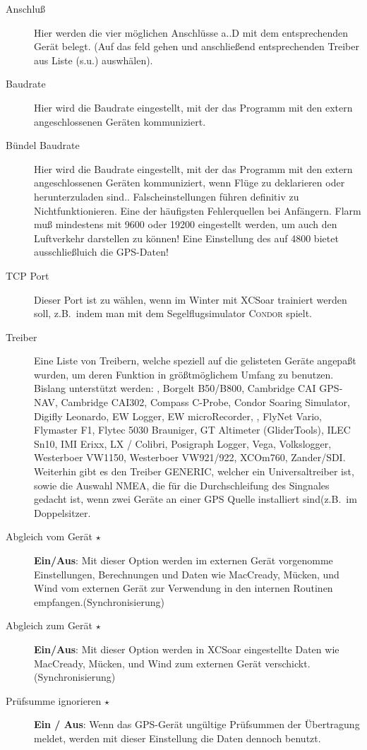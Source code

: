 \begin{description}
\item[Anschluß]  Hier werden die vier möglichen Anschlüsse a..D mit dem entsprechenden Gerät belegt. (Auf das feld gehen und anschließend entsprechenden Treiber aus Liste (s.u.) auswhälen).
\item[Baudrate] Hier wird die Baudrate eingestellt, mit der das Programm mit den extern angeschlossenen Geräten kommuniziert.
\item[Bündel Baudrate]  Hier wird die Baudrate eingestellt, mit der das Programm mit den extern angeschlossenen Geräten kommuniziert, wenn Flüge zu deklarieren oder herunterzuladen sind..
Falscheinstellungen führen definitiv zu Nichtfunktionieren. Eine der häufigsten  Fehlerquellen bei Anfängern.
\achtung Flarm muß  mindestens mit 9600 oder 19200 eingestellt werden, um auch den Luftverkehr darstellen zu können! Eine Einstellung des \fl auf 4800 bietet ausschließluich die GPS-Daten!
\item[TCP Port]  Dieser Port ist zu wählen, wenn  im Winter mit \textsf{XCSoar} trainiert werden soll, z.B.\ indem man  mit dem
Segelflugsimulator \textsc{Condor} spielt.
\item[Treiber] Eine Liste von Treibern, welche speziell auf die gelisteten Geräte angepaßt wurden, um deren Funktion in größtmöglichem Umfang zu benutzen.
Bislang unterstützt werden: \al, Borgelt B50/B800, Cambridge CAI GPS-NAV, Cambridge CAI302, Compass C-Probe, Condor Soaring Simulator, Digifly Leonardo,  EW Logger, EW microRecorder,
\fl, FlyNet Vario, Flymaster F1, Flytec 5030 Brauniger, GT Altimeter (GliderTools), ILEC Sn10, IMI Erixx, LX / Colibri, Posigraph Logger, Vega, Volkslogger, Westerboer VW1150, Westerboer VW921/922, XCOm760, Zander/SDI.
Weiterhin gibt es den Treiber GENERIC, welcher ein Universaltreiber ist, sowie die Auswahl NMEA, die für die Durchschleifung des Singnales gedacht ist, wenn zwei Geräte an einer GPS Quelle installiert sind(z.B.\ im Doppelsitzer.
\item[Abgleich vom Gerät $\star$]  {\bf Ein/Aus}: Mit dieser Option werden im externen Gerät vorgenomme Einstellungen, Berechnungen und Daten wie MacCready, Mücken, und Wind vom externen Gerät zur Verwendung in den internen Routinen empfangen.(Synchronisierung)
\item[Abgleich zum Gerät $\star$]  {\bf Ein/Aus}: Mit dieser Option werden in \textsf{XCSoar} eingestellte Daten wie MacCready, Mücken, und Wind zum externen Gerät verschickt. (Synchronisierung)
\item[Prüfsumme ignorieren $\star$] {\bf Ein / Aus}: Wenn das GPS-Gerät ungültige Prüfsummen der Übertragung meldet, werden mit
dieser Einstellung  die Daten dennoch benutzt.
\end{description}


